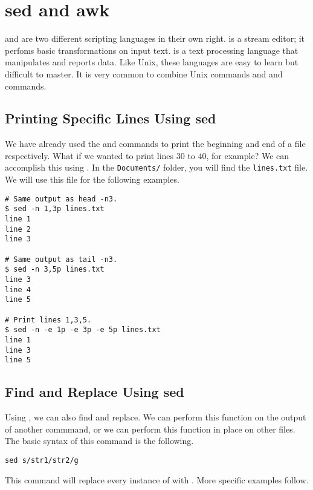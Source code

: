 \section*{sed and awk} %

 and  are two different scripting languages in their own right.
 is a stream editor; it perfoms basic transformations on input text.
 is a text processing language that manipulates and reports data.
Like Unix, these languages are easy to learn but difficult to master.
It is very common to combine Unix commands and  and  commands.

\subsection*{Printing Specific Lines Using sed} %

We have already used the  and  commands to print the beginning and end of a file respectively.
What if we wanted to print lines $30$ to $40$, for example?
We can accomplish this using .
In the \texttt{Documents/} folder, you will find the \texttt{lines.txt} file.
We will use this file for the following examples.

\begin{lstlisting}
# Same output as head -n3.
$ sed -n 1,3p lines.txt
line 1
line 2
line 3

# Same output as tail -n3.
$ sed -n 3,5p lines.txt
line 3
line 4
line 5

# Print lines 1,3,5.
$ sed -n -e 1p -e 3p -e 5p lines.txt
line 1
line 3
line 5
\end{lstlisting}

\subsection*{Find and Replace Using sed} %

Using , we can also find and replace.
We can perform this function on the output of another commmand, or we can perform this function in place on other files.
The basic syntax of this  command is the following.

\begin{lstlisting}
sed s/str1/str2/g
\end{lstlisting}

This command will replace every instance of  with . More specific examples follow.

